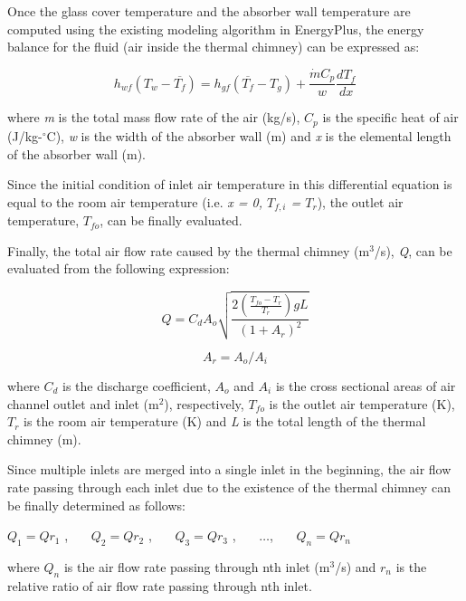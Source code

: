 Once the glass cover temperature and the absorber wall temperature are computed using the existing modeling algorithm in EnergyPlus, the energy balance for the fluid (air inside the thermal chimney) can be expressed as:

\begin{equation}
{h_{wf}}({T_w} - \overline {{T_f}} ) = {h_{gf}}(\overline {{T_f}}  - {T_g}) + \frac{{\dot m{C_p}}}{w}\frac{{d{T_f}}}{{dx}}
\end{equation}

where \emph{m} is the total mass flow rate of the air (kg/s), \(C_{p}\) is the specific heat of air (J/kg-\(^{\circ}\)C), \emph{w} is the width of the absorber wall (m) and \emph{x} is the elemental length of the absorber wall (m).

Since the initial condition of inlet air temperature in this differential equation is equal to the room air temperature (i.e. \emph{x = 0, \(T_{f,i}\) = \(T_{r}\)}), the outlet air temperature, \(T_{fo}\), can be finally evaluated.

Finally, the total air flow rate caused by the thermal chimney (m\(^{3}\)/s), \emph{Q}, can be evaluated from the following expression:

\begin{equation}
Q = {C_d}{A_o}\sqrt {\frac{{2(\frac{{{T_{fo}} - {T_r}}}{{{T_r}}})gL}}{{{{(1 + {A_r})}^2}}}}
\end{equation}

\begin{equation}
{A_r} = {A_o}/{A_i}
\end{equation}

where \(C_{d}\) is the discharge coefficient, \(A_{o}\) and \(A_{i}\) is the cross sectional areas of air channel outlet and inlet (m\(^{2}\)), respectively, \(T_{fo}\) is the outlet air temperature (K), \(T_{r}\) is the room air temperature (K) and \emph{L} is the total length of the thermal chimney (m).

Since multiple inlets are merged into a single inlet in the beginning, the air flow rate passing through each inlet due to the existence of the thermal chimney can be finally determined as follows:

\({Q_1} = Q{r_1}\) ,~~~ \({Q_2} = Q{r_2}\) ,~~~ \({Q_3} = Q{r_3}\) ,~~~ \(\ldots\),~~~ \({Q_n} = Q{r_n}\)

where \(Q_{n}\) is the air flow rate passing through nth inlet (m\(^{3}\)/s) and \(r_{n}\) is the relative ratio of air flow rate passing through nth inlet.

